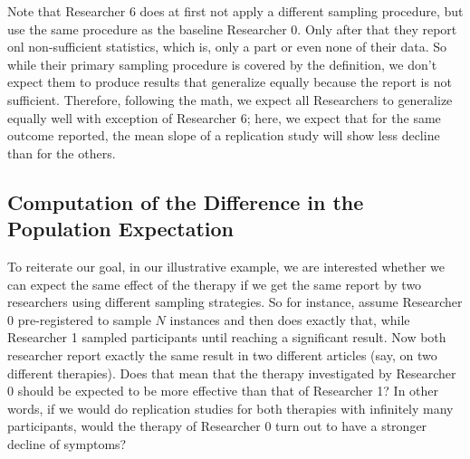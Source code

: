 \documentclass[man]{apa7}\usepackage[]{graphicx}\usepackage[]{xcolor}
\theoremstyle{definition}
\begin{document}
Note that Researcher 6 does at first not apply a different sampling procedure, but use the same procedure as the baseline Researcher 0. %
Only after that they report onl non-sufficient statistics, which is, only a part or even none of their data. So while their primary sampling procedure is covered by the definition, we don't expect them to produce results that generalize equally because the report is not sufficient. Therefore, following the math, we expect all Researchers to generalize equally well with exception of Researcher 6; here, we expect that for the same outcome reported, the mean slope of a replication study will show less decline than for the others. 

\subsection{Computation of the Difference in the Population Expectation}
To reiterate our goal, in our illustrative example, we are interested whether we can expect the same effect of the therapy if we get the same report by two researchers using different sampling strategies. So for instance, assume Researcher 0 pre-registered to sample $N$ instances and then does exactly that, while Researcher 1 sampled participants until reaching a significant result. Now both researcher report exactly the same result in two different articles (say, on two different therapies). Does that mean that the therapy investigated by Researcher 0 should be expected to be more effective than that of Researcher 1? In other words, if we would do replication studies for both therapies with infinitely many participants, would the therapy of Researcher 0 turn out to have a stronger decline of symptoms? 
\end{document}
